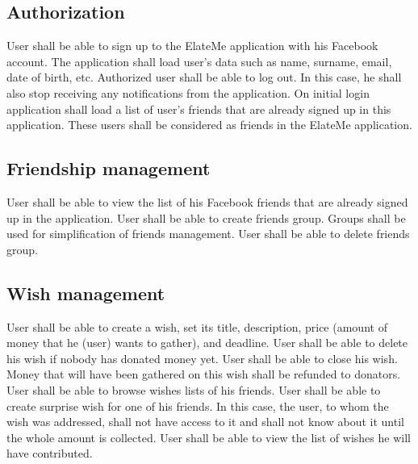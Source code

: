 \subsection*{Authorization}
\begin{itemize}
User shall be able to sign up to the ElateMe application with his Facebook account. The application shall load user's
data such as name, surname, email, date of birth, etc.
Authorized user shall be able to log out. In this case, he shall also stop receiving any notifications from
the application.
On initial login application shall load a list of user's friends that are already signed up in this application. These
users shall be considered as friends in the ElateMe application.
\end{itemize}

\subsection*{Friendship management}

\begin{itemize}
User shall be able to view the list of his Facebook friends that are already signed up in the application.
User shall be able to create friends group. Groups shall be used for simplification of friends management.
User shall be able to delete friends group.
\end{itemize}

\subsection*{Wish management}

\begin{itemize}
User shall be able to create a wish, set its title, des\-cription, price (amount of money that he (user) wants
to gather), and deadline.
User shall be able to delete his wish if nobody has donated money yet.
User shall be able to close his wish. Money that will have been gathered on this wish shall be refunded to donators.
User shall be able to browse wishes lists of his friends.
User shall be able to create surprise wish for one of his friends. In this case, the user, to whom the wish was
addressed, shall not have access to it and shall not know about it until the whole amount is collected.
User shall be able to view the list of wishes he will have contributed.
\end{itemize}

